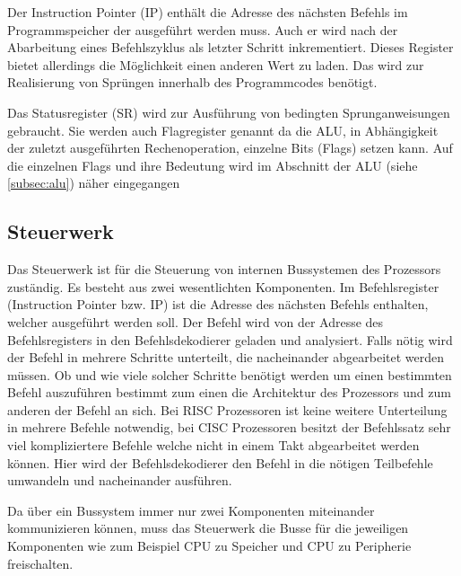 \documentclass[12pt]{article}
\begin{document}
\par \bigskip
\noindent Der Instruction Pointer (IP) enthält die Adresse des nächsten Befehls im Programmspeicher der ausgeführt werden muss. Auch er wird nach der Abarbeitung eines Befehlszyklus als letzter Schritt inkrementiert. Dieses Register bietet allerdings die Möglichkeit einen anderen Wert zu laden. Das wird zur Realisierung von Sprüngen innerhalb des Programmcodes benötigt. 

\par \bigskip
\noindent Das Statusregister (SR) wird zur Ausführung von bedingten Sprunganweisungen gebraucht. Sie werden auch Flagregister genannt da die ALU, in Abhängigkeit der zuletzt ausgeführten Rechenoperation, einzelne Bits (Flags) setzen kann. Auf die einzelnen Flags und ihre Bedeutung wird im Abschnitt der ALU (siehe \ref{subsec:alu}) näher eingegangen

\subsection{Steuerwerk}
Das Steuerwerk ist für die Steuerung von internen Bussystemen des Prozessors zuständig. Es besteht aus zwei wesentlichten Komponenten. Im Befehlsregister (Instruction Pointer bzw. IP) ist die Adresse des nächsten Befehls enthalten, welcher ausgeführt werden soll. Der Befehl wird von der Adresse des Befehlsregisters in den Befehlsdekodierer geladen und analysiert. Falls nötig wird der Befehl in mehrere Schritte unterteilt, die nacheinander abgearbeitet werden müssen. Ob und wie viele solcher Schritte benötigt werden um einen bestimmten Befehl auszuführen bestimmt zum einen die Architektur des Prozessors und zum anderen der Befehl an sich. Bei RISC Prozessoren ist keine weitere Unterteilung in mehrere Befehle notwendig, bei CISC Prozessoren besitzt der Befehlssatz sehr viel kompliziertere Befehle welche nicht in einem Takt abgearbeitet werden können. Hier wird der Befehlsdekodierer den Befehl in die nötigen Teilbefehle umwandeln und nacheinander ausführen.




Da über ein Bussystem immer nur zwei Komponenten miteinander kommunizieren können, muss das Steuerwerk die Busse für die jeweiligen Komponenten wie zum Beispiel CPU zu Speicher und CPU zu Peripherie freischalten. 
\end{document}
